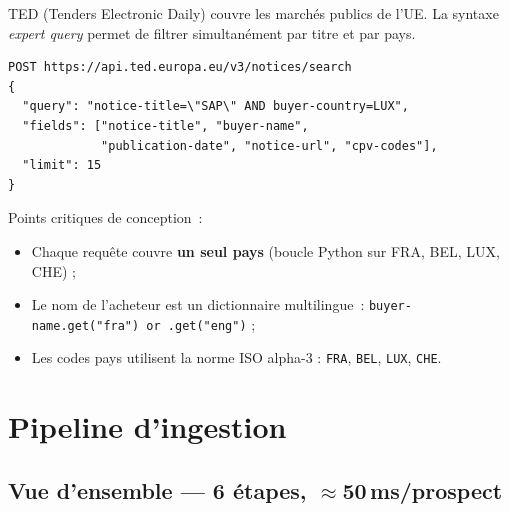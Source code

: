 TED (Tenders Electronic Daily) couvre les marchés publics de l'UE. La syntaxe
\emph{expert query} permet de filtrer simultanément par titre et par pays.

\begin{lstlisting}[language=Python3, caption={Requête TED EU (expert query)}, label=lst:ted]
POST https://api.ted.europa.eu/v3/notices/search
{
  "query": "notice-title=\"SAP\" AND buyer-country=LUX",
  "fields": ["notice-title", "buyer-name",
             "publication-date", "notice-url", "cpv-codes"],
  "limit": 15
}
\end{lstlisting}

Points critiques de conception~:
\begin{itemize}
  \item Chaque requête couvre \textbf{un seul pays} (boucle Python sur FRA, BEL, LUX, CHE) ;
  \item Le nom de l'acheteur est un dictionnaire multilingue~: \texttt{buyer-name.get("fra") or .get("eng")} ;
  \item Les codes pays utilisent la norme ISO alpha-3 : \texttt{FRA}, \texttt{BEL}, \texttt{LUX}, \texttt{CHE}.
\end{itemize}

\section{Pipeline d'ingestion}

\subsection{Vue d'ensemble — 6 étapes, $\approx$50\,ms/prospect}

